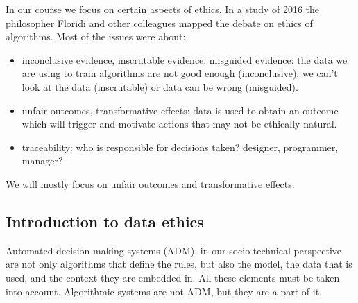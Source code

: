 In our course we focus on certain aspects of ethics. In a study of 2016 the philosopher Floridi and other colleagues mapped the debate on ethics of algorithms. Most of the issues were about:
\begin{itemize}
    \item inconclusive evidence, inscrutable evidence, misguided evidence: the data we are using to train algorithms are not good enough (inconclusive), we can't look at the data (inscrutable) or data can be wrong (misguided). 
    \item unfair outcomes, transformative effects: data is used to obtain an outcome which will trigger and motivate actions that may not be ethically natural.
    \item traceability: who is responsible for decisions taken? designer, programmer, manager?
\end{itemize}
We will mostly focus on unfair outcomes and transformative effects.

\subsection{Introduction to data ethics}
Automated decision making systems (ADM), in our socio-technical perspective are not only algorithms that define the rules, but also the model, the data that is used, and the context they are embedded in. All these elements must be taken into account. Algorithmic systems are not ADM, but they are a part of it.

